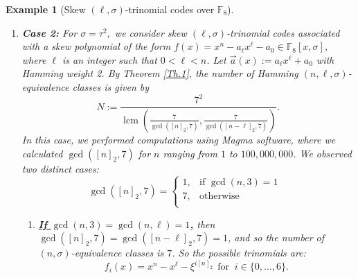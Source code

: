 \documentclass[12pt,paper]{article}
\theoremstyle{plain}
\newtheorem{example}[theorem]{Example}
\DeclareMathOperator{\lcm}{lcm}
\begin{document}
\begin{example}[Skew $(\ell,\sigma)$-trinomial  codes  over $\mathbb{F}_{8}$]
\begin{enumerate}
\begin{enumerate}
   \item \underline{\textbf{If  $  \gcd(n, 3)=1$  and  $\gcd(n-\ell, 3)=3 $,}}  then  the number of equivalence classes is  $N=7.$ 
   In this case, $ d_{0}= \gcd([n]_1, 7)= 1,\ \ d_{\ell}= \gcd( [n-\ell]_1, 7)= 7 .$ 
   It follows that each  skew $(\ell,\sigma)$-trinomial  code associated with a skew  polynomial $f$ of the form  $f =x^{n}- a_{\ell} x^{\ell}-a_0$ is equivalent to a  skew $(\ell,\sigma)$-trinomial  code  associated with one of the following  skew polynomials: 
  $$f_{i}(x)= x^{n} - \xi^i x^{\ell} - 1 \ \ \text{for } i\in \{0,\ldots, 6\}.  $$ 
  \item  \textbf{\underline{If  $  \gcd(n, 3)=3$  and  $\gcd(n-\ell, 3)=1 $, } } then, as above, we obtain that each 
  each  skew $(\ell,\sigma)$-trinomial  code associated with a skew  polynomial $f$ of the form  $f =x^{n}- a_{\ell} x^{\ell}-a_0,$ is equivalent to a  skew $(\ell,\sigma)$-trinomial  code  associated with one of the following  skew polynomials: 
  $$f_{i}(x)= x^{n} -  x^{\ell} - \xi^i \ \ \text{for } i\in \{0,\ldots, 6\}.  $$ 

    \end{enumerate}

\item \textbf{Case 2:} For $\sigma=\tau^2,$  we consider skew $(\ell,\sigma)$-trinomial   codes   associated with  a skew polynomial of the form $f(x) =x^{n}-a_{\ell}x^{\ell}-a_0\in \mathbb{F}_{8}[x,\sigma]$, where $\ell $ is an integer such that $0<\ell <n$.  Let $\vec{a}(x):=   a_{\ell}x^{\ell}+a_0 $  with  Hamming weight 2.   By Theorem  \ref{Th.1}, the number of Hamming $(n,\ell, \sigma)$-equivalence classes is given by  
 $$N:=\dfrac{7^2}{ \lcm\left(\frac{7}{\gcd( [n]_2 ,7 )}, \frac{7}{\gcd( [n-\ell]_2,7)}  \right)}.
 $$
 In this case, we performed computations  using Magma software, where we calculated $\operatorname{gcd}([n]_2, 7)$ for $n$ ranging from $1$ to $100,000,000$. We observed two distinct cases: 
$$
\gcd([n]_2, 7) = \begin{cases}
 1 , & \text{if $\gcd(n,3)=1$ }\\
7, & \text{otherwise }\\
  \end{cases} 
$$     

 \begin{enumerate}

 \item \underline{\textbf{If $\gcd(n,3)= \gcd(n,\ell)=1$,}} then $\displaystyle{  \gcd([n]_2, 7)=  \gcd([n-\ell]_2, 7)= 1}$, and so the number of  $(n, \sigma)$-equivalence classes is $ 7$. So the possible trinomials are: 
     $$f_{i}(x)= x^{n} - x^{\ell} - \xi^{ i [n]_2 }  \ \ \text{for  }\  i\in \{0,\ldots, 6\}.  $$ 


\end{enumerate}
\end{enumerate}
\end{example}
\end{document}
